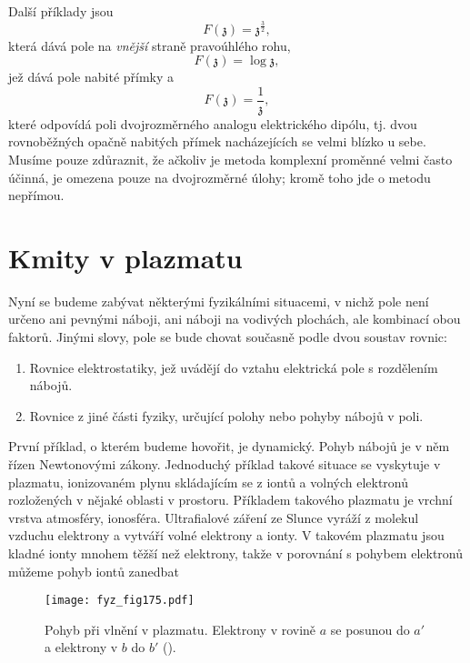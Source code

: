   Další příklady jsou
  \begin{equation}\label{fyz:eq838}
    F(\mathfrak{z}) = \mathfrak{z}^\frac{3}{2},
  \end{equation}
  která dává pole na \emph{vnější} straně pravoúhlého rohu,
  \begin{equation}\label{fyz:eq839}
    F(\mathfrak{z}) = \log\mathfrak{z},
  \end{equation}
  jež dává pole nabité přímky a
  \begin{equation}\label{fyz:eq840}
    F(\mathfrak{z}) = \dfrac{1}{\mathfrak{z}},
  \end{equation}
  které odpovídá poli dvojrozměrného analogu elektrického dipólu, tj. dvou rovnoběžných opačně
  nabitých přímek nacházejících se velmi blízko u sebe. Musíme pouze zdůraznit, že ačkoliv je metoda
  komplexní proměnné velmi často účinná, je omezena pouze na dvojrozměrné úlohy; kromě toho jde o
  metodu nepřímou.
  
\section{Kmity v plazmatu}\label{fyz:IIchapVsecXXIV} 
  Nyní se budeme zabývat některými fyzikálními situacemi, v nichž pole není určeno ani pevnými
  náboji, ani náboji na vodivých plochách, ale kombinací obou faktorů. Jinými slovy, pole se bude
  chovat současně podle dvou soustav rovnic:
  \begin{enumerate}
    \item Rovnice elektrostatiky, jež uvádějí do vztahu elektrická pole s rozdělením nábojů.
    \item Rovnice z jiné části fyziky, určující polohy nebo pohyby nábojů v poli.
  \end{enumerate}

  První příklad, o kterém budeme hovořit, je dynamický. Pohyb nábojů je v něm řízen Newtonovými
  zákony. Jednoduchý příklad takové situace se vyskytuje v plazmatu, ionizovaném plynu skládajícím
  se z iontů a volných elektronů rozložených v nějaké oblasti v prostoru. Příkladem takového
  plazmatu je vrchní vrstva atmosféry, ionosféra. Ultrafialové záření ze Slunce vyráží z molekul
  vzduchu elektrony a vytváří volné elektrony a ionty. V takovém plazmatu jsou kladné ionty mnohem
  těžší než elektrony, takže v porovnání s pohybem elektronů můžeme pohyb iontů zanedbat
  
  \begin{figure}[ht!]  %
    \centering
    \texttt{[image: fyz\_fig175.pdf]}
    \caption{Pohyb při vlnění v plazmatu. Elektrony v rovině \(a\) se posunou do \(a'\) a 
             elektrony v \(b\) do \(b'\)
             (\cite[s.~130]{Feynman02}).}
    \label{fyz:fig175}
  \end{figure}

